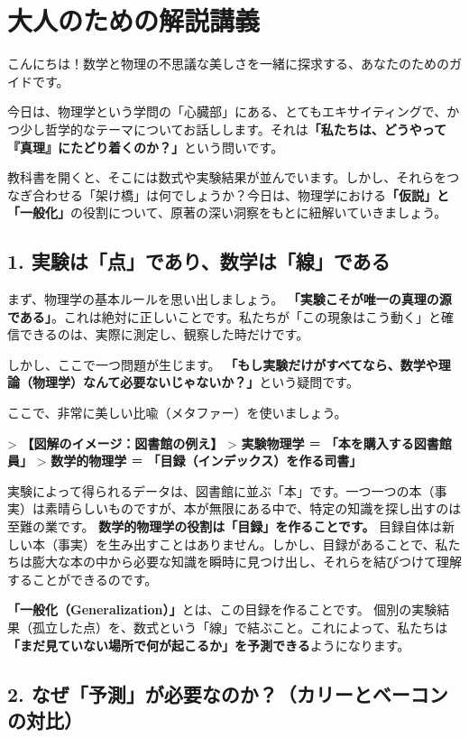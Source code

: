 \documentclass[a4paper,11pt,openany]{ltjsbook}
\begin{document}
\section{大人のための解説講義}
\begin{lecturebox}
こんにちは！数学と物理の不思議な美しさを一緒に探求する、あなたのためのガイドです。

今日は、物理学という学問の「心臓部」にある、とてもエキサイティングで、かつ少し哲学的なテーマについてお話しします。それは\textbf{「私たちは、どうやって『真理』にたどり着くのか？」}という問いです。

教科書を開くと、そこには数式や実験結果が並んでいます。しかし、それらをつなぎ合わせる「架け橋」は何でしょうか？今日は、物理学における\textbf{「仮説」と「一般化」}の役割について、原著の深い洞察をもとに紐解いていきましょう。

\subsection*{1. 実験は「点」であり、数学は「線」である}

まず、物理学の基本ルールを思い出しましょう。
\textbf{「実験こそが唯一の真理の源である」}。これは絶対に正しいことです。私たちが「この現象はこう動く」と確信できるのは、実際に測定し、観察した時だけです。

しかし、ここで一つ問題が生じます。
\textbf{「もし実験だけがすべてなら、数学や理論（物理学）なんて必要ないじゃないか？」}という疑問です。

ここで、非常に美しい比喩（メタファー）を使いましょう。

> \textbf{【図解のイメージ：図書館の例え】}
>    \textbf{実験物理学} ＝ \textbf{「本を購入する図書館員」}
>    \textbf{数学的物理学} ＝ \textbf{「目録（インデックス）を作る司書」}

実験によって得られるデータは、図書館に並ぶ「本」です。一つ一つの本（事実）は素晴らしいものですが、本が無限にある中で、特定の知識を探し出すのは至難の業です。
\textbf{数学的物理学の役割は「目録」を作ることです。} 目録自体は新しい本（事実）を生み出すことはありません。しかし、目録があることで、私たちは膨大な本の中から必要な知識を瞬時に見つけ出し、それらを結びつけて理解することができるのです。

\textbf{「一般化（Generalization）」}とは、この目録を作ることです。
個別の実験結果（孤立した点）を、数式という「線」で結ぶこと。これによって、私たちは\textbf{「まだ見ていない場所で何が起こるか」を予測できる}ようになります。

\subsection*{2. なぜ「予測」が必要なのか？（カリーとベーコンの対比）}


\end{lecturebox}
\end{document}

